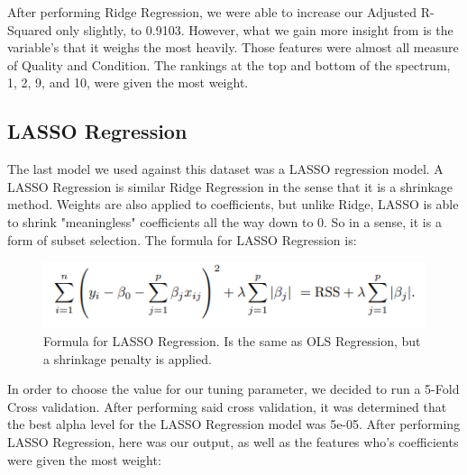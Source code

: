 \documentclass{article}
\begin{document}
	After performing Ridge Regression, we were able to increase our Adjusted R-Squared only slightly, to 0.9103. However, what we gain more insight from is the variable's that it weighs the most heavily. Those features were almost all measure of Quality and Condition. The rankings at the top and bottom of the spectrum, 1, 2, 9, and 10, were given the most weight. 

	\subsection{LASSO Regression}

	The last model we used against this dataset was a LASSO regression model. A LASSO Regression is similar Ridge Regression in the sense that it is a shrinkage method. Weights are also applied to coefficients, but unlike Ridge, LASSO is able to shrink "meaningless" coefficients all the way down to 0. So in a sense, it is a form of subset selection. The formula for LASSO Regression is:

	\begin{figure}[H]
		\includegraphics[width=\textwidth]{lassoform}
		\caption{Formula for LASSO Regression. Is the same as OLS Regression, but a shrinkage penalty is applied.}
		\label{fig:skew}
	\end{figure}

	In order to choose the value for our tuning parameter, we decided to run a 5-Fold Cross validation. After performing said cross validation, it was determined that the best alpha level for the LASSO Regression model was 5e-05. After performing LASSO Regression, here was our output, as well as the features who's coefficients were given the most weight:

\end{document}
